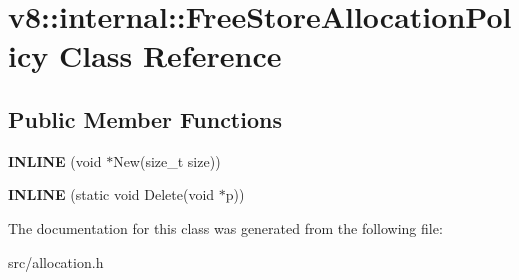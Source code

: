 \hypertarget{classv8_1_1internal_1_1_free_store_allocation_policy}{}\section{v8\+:\+:internal\+:\+:Free\+Store\+Allocation\+Policy Class Reference}
\label{classv8_1_1internal_1_1_free_store_allocation_policy}
\subsection*{Public Member Functions}
\begin{DoxyCompactItemize}
\item 
\hypertarget{classv8_1_1internal_1_1_free_store_allocation_policy_ac35066005db1902291d2bff8aa5b9bf7}{}{\bfseries I\+N\+L\+I\+N\+E} (void $\ast$New(size\+\_\+t size))\label{classv8_1_1internal_1_1_free_store_allocation_policy_ac35066005db1902291d2bff8aa5b9bf7}

\item 
\hypertarget{classv8_1_1internal_1_1_free_store_allocation_policy_afbd9ff2bc07d94ff427d37c51476054a}{}{\bfseries I\+N\+L\+I\+N\+E} (static void Delete(void $\ast$p))\label{classv8_1_1internal_1_1_free_store_allocation_policy_afbd9ff2bc07d94ff427d37c51476054a}

\end{DoxyCompactItemize}


The documentation for this class was generated from the following file\+:\begin{DoxyCompactItemize}
\item 
src/allocation.\+h\end{DoxyCompactItemize}
